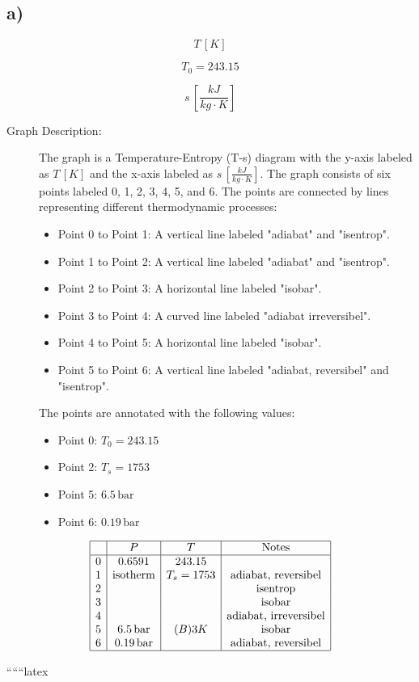 

\subsection*{a)}

\[
T \, [K]
\]

\[
T_0 = 243.15
\]

\[
s \, \left[ \frac{kJ}{kg \cdot K} \right]
\]

\begin{description}
    \item[Graph Description:] 
    The graph is a Temperature-Entropy (T-s) diagram with the y-axis labeled as \( T \, [K] \) and the x-axis labeled as \( s \, \left[ \frac{kJ}{kg \cdot K} \right] \). The graph consists of six points labeled 0, 1, 2, 3, 4, 5, and 6. The points are connected by lines representing different thermodynamic processes:
    \begin{itemize}
        \item Point 0 to Point 1: A vertical line labeled "adiabat" and "isentrop".
        \item Point 1 to Point 2: A vertical line labeled "adiabat" and "isentrop".
        \item Point 2 to Point 3: A horizontal line labeled "isobar".
        \item Point 3 to Point 4: A curved line labeled "adiabat irreversibel".
        \item Point 4 to Point 5: A horizontal line labeled "isobar".
        \item Point 5 to Point 6: A vertical line labeled "adiabat, reversibel" and "isentrop".
    \end{itemize}
    The points are annotated with the following values:
    \begin{itemize}
        \item Point 0: \( T_0 = 243.15 \)
        \item Point 2: \( T_s = 1753 \)
        \item Point 5: \( 6.5 \, \text{bar} \)
        \item Point 6: \( 0.19 \, \text{bar} \)
    \end{itemize}
\end{description}

\[
\begin{array}{|c|c|c|c|}
\hline
 & P & T & \text{Notes} \\
\hline
0 & 0.6591 & 243.15 & \\
1 & \text{isotherm} & T_s = 1753 & \text{adiabat, reversibel} \\
2 & & & \text{isentrop} \\
3 & & & \text{isobar} \\
4 & & & \text{adiabat, irreversibel} \\
5 & 6.5 \, \text{bar} & (B) 3K & \text{isobar} \\
6 & 0.19 \, \text{bar} & & \text{adiabat, reversibel} \\
\hline
\end{array}
\]

``````latex